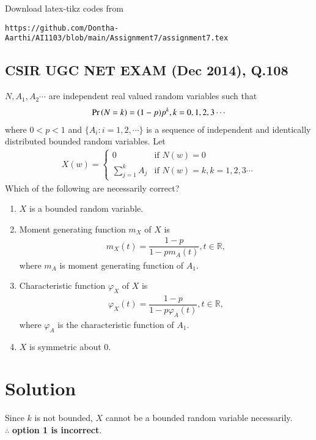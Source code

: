 \documentclass[journal,12pt,twocolumn]{IEEEtran}
\begin{document}
Download latex-tikz codes from 

\begin{lstlisting}
https://github.com/Dontha-Aarthi/AI1103/blob/main/Assignment7/assignment7.tex
\end{lstlisting}
\begin{center}
  \section{\textbf{CSIR UGC NET EXAM (Dec 2014), Q.108}} 
\end{center}
    $N,A_1,A_2\cdots$ are independent real valued random variables such that 
    \begin{align}
        \Pr\left(N=k\right)=(1-p)p^k,k=0,1,2,3\cdots
    \end{align}
    where $0<p<1$ and $\{A_i:i=1,2,\cdots\}$ is a sequence of independent and identically distributed bounded random variables. Let 
    \begin{align}
        X(w) = 
        \begin{cases}
        0  & \text{if } N(w)=0\\
        \sum_{j=1}^{k} A_j & \text{if } N(w)=k,k=1,2,3\cdots 
        \end{cases}
    \end{align}
    Which of the following are necessarily correct?\\
    \begin{enumerate}
        \item $X$ is a bounded random variable. 
        \item Moment generating function $m_X$ of $X$ is
        \begin{align}
            m_X(t)=\dfrac{1-p}{1-pm_A(t)}, t\in \mathbb{R},
        \end{align}
        where $m_A$ is moment generating function of $A_1$.
        \item Characteristic function $\varphi_X$ of $X$ is
        \begin{align}
            \varphi_X(t)=\dfrac{1-p}{1-p\varphi_A(t)},t\in \mathbb{R},
        \end{align}
        where $\varphi_A$ is the characteristic function of $A_1$.
        \item $X$ is symmetric about 0.
    \end{enumerate}
\section{Solution}
Since $k$ is not bounded, $X$ cannot be a bounded random variable necessarily.\\
$\therefore$ \textbf{option 1 is incorrect}.\\
\end{document}
